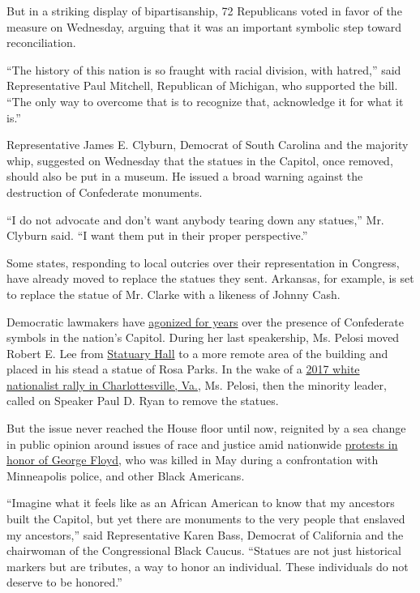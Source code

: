 But in a striking display of bipartisanship, 72 Republicans voted in
favor of the measure on Wednesday, arguing that it was an important
symbolic step toward reconciliation.

``The history of this nation is so fraught with racial division, with
hatred,'' said Representative Paul Mitchell, Republican of Michigan, who
supported the bill. ``The only way to overcome that is to recognize
that, acknowledge it for what it is.''

Representative James E. Clyburn, Democrat of South Carolina and the
majority whip, suggested on Wednesday that the statues in the Capitol,
once removed, should also be put in a museum. He issued a broad warning
against the destruction of Confederate monuments.

``I do not advocate and don't want anybody tearing down any statues,''
Mr. Clyburn said. ``I want them put in their proper perspective.''

Some states, responding to local outcries over their representation in
Congress, have already moved to replace the statues they sent. Arkansas,
for example, is set to replace the statue of Mr. Clarke with a likeness
of Johnny Cash.

Democratic lawmakers have
\href{https://www.nytimes3xbfgragh.onion/2015/06/26/us/politics/search-for-confederate-symbols-finds-them-aplenty-in-washington.html}{agonized
for years} over the presence of Confederate symbols in the nation's
Capitol. During her last speakership, Ms. Pelosi moved Robert E. Lee
from
\href{http://www.aoc.gov/capitol-buildings/national-statuary-hall}{Statuary
Hall} to a more remote area of the building and placed in his stead a
statue of Rosa Parks. In the wake of a
\href{https://www.nytimes3xbfgragh.onion/2017/07/08/us/kkk-rally-charlottesville-robert-e-lee-statue.html}{2017
white nationalist rally in Charlottesville, Va.}, Ms. Pelosi, then the
minority leader, called on Speaker Paul D. Ryan to remove the statues.

But the issue never reached the House floor until now, reignited by a
sea change in public opinion around issues of race and justice amid
nationwide
\href{https://www.nytimes3xbfgragh.onion/news-event/george-floyd-protests-minneapolis-new-york-los-angeles}{protests
in honor of George Floyd}, who was killed in May during a confrontation
with Minneapolis police, and other Black Americans.

``Imagine what it feels like as an African American to know that my
ancestors built the Capitol, but yet there are monuments to the very
people that enslaved my ancestors,'' said Representative Karen Bass,
Democrat of California and the chairwoman of the Congressional Black
Caucus. ``Statues are not just historical markers but are tributes, a
way to honor an individual. These individuals do not deserve to be
honored.''

